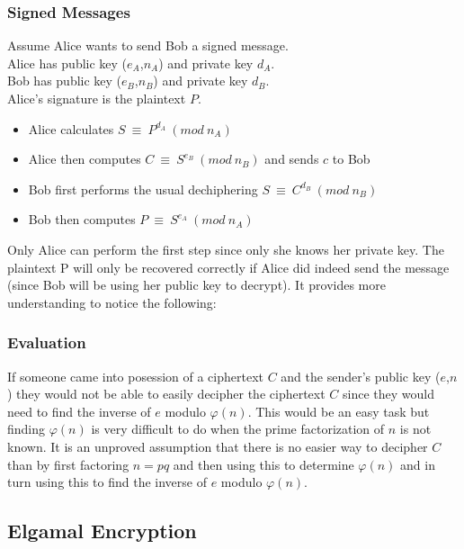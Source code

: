 \documentclass{article}
\begin{document}
	\subsubsection{Signed Messages}
	Assume Alice wants to send Bob a signed message.\\
	Alice has public key ($e_A$,$n_A$) and private key $d_A$.\\
	Bob has public key ($e_B$,$n_B$) and private key $d_B$.\\
	Alice's signature is the plaintext $P$.\\
	\begin{itemize}
		\item Alice calculates $S~\equiv~P^{d_A}~(mod~n_A)$
		\item Alice then computes $C~\equiv~S^{e_B}~(mod~n_B)$ and sends $c$ to Bob
		\item Bob first performs the usual dechiphering $S~\equiv~C^{d_B}~(mod~n_B)$
		\item Bob then computes $P~\equiv~S^{e_A}~(mod~n_A)$
	\end{itemize}
	Only Alice can perform the first step since only she knows her private key. The plaintext P will only be recovered correctly if Alice did indeed send the message (since Bob will be using her public key to decrypt). It provides more understanding to notice the following:\\

	
	\subsubsection{Evaluation}
	If someone came into posession of a ciphertext $C$ and the sender's public key ($e$,$n$) they would not be able to easily decipher the ciphertext $C$ since they would need to find the inverse of $e$ modulo $\varphi(n)$. This would be an easy task but finding $\varphi(n)$ is very difficult to do when the prime factorization of $n$ is not known. It is an unproved assumption that there is no easier way to decipher $C$ than by first factoring $n=pq$ and then using this to determine $\varphi(n)$ and in turn using this to find the inverse of $e$ modulo $\varphi(n)$.
	
\subsection{Elgamal Encryption}
	\subsubsection{}
\end{document}
